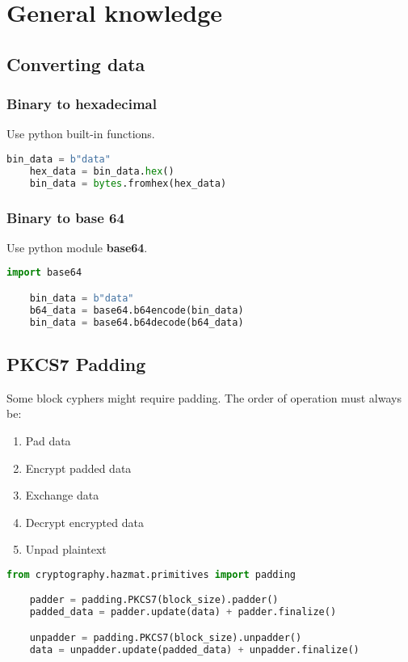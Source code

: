 \documentclass[a4paper, 12 pt]{memoir}
\begin{document}
\chapter{General knowledge}

\section{Converting data}

\subsection{Binary to hexadecimal}
Use python built-in functions.
\begin{lstlisting}[language=Python]
    bin_data = b"data"
    hex_data = bin_data.hex()
    bin_data = bytes.fromhex(hex_data)
\end{lstlisting}

\subsection{Binary to base 64}
Use python module \textbf{base64}.
\begin{lstlisting}[language=Python]
    import base64

    bin_data = b"data"
    b64_data = base64.b64encode(bin_data)
    bin_data = base64.b64decode(b64_data)
\end{lstlisting}

\section{PKCS7 Padding}
Some block cyphers might require padding. The order of operation must always be:
\begin{enumerate}
    \item Pad data
    \item Encrypt padded data
    \item Exchange data
    \item Decrypt encrypted data
    \item Unpad plaintext
\end{enumerate}

\begin{lstlisting}[language=Python]
    from cryptography.hazmat.primitives import padding

    padder = padding.PKCS7(block_size).padder()
    padded_data = padder.update(data) + padder.finalize()

    unpadder = padding.PKCS7(block_size).unpadder()
    data = unpadder.update(padded_data) + unpadder.finalize()

\end{lstlisting}
\end{document}
